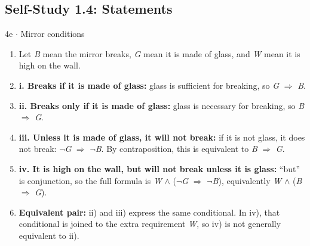 \documentclass[11pt]{article}
\begin{document}
\begin{keepsection}\subsection{Self-Study 1.4: Statements}

\begin{workedbox}{4e \ensuremath{\cdot} Mirror conditions}
\begin{enumerate}
\item Let \textit{B} mean the mirror breaks, \textit{G} mean it is made of glass, and \textit{W} mean it is high on the wall.
\item \textbf{i. Breaks if it is made of glass:} glass is sufficient for breaking, so \textit{G} \ensuremath{\Rightarrow} \textit{B}.
\item \textbf{ii. Breaks only if it is made of glass:} glass is necessary for breaking, so \textit{B} \ensuremath{\Rightarrow} \textit{G}.
\item \textbf{iii. Unless it is made of glass, it will not break:} if it is not glass, it does not break: \ensuremath{\neg}\textit{G} \ensuremath{\Rightarrow} \ensuremath{\neg}\textit{B}. By contraposition, this is equivalent to \textit{B} \ensuremath{\Rightarrow} \textit{G}.
\item \textbf{iv. It is high on the wall, but will not break unless it is glass:} “but” is conjunction, so the full formula is \textit{W} \ensuremath{\land} (\ensuremath{\neg}\textit{G} \ensuremath{\Rightarrow} \ensuremath{\neg}\textit{B}), equivalently \textit{W} \ensuremath{\land} (\textit{B} \ensuremath{\Rightarrow} \textit{G}).
\item \textbf{Equivalent pair:} ii) and iii) express the same conditional. In iv), that conditional is joined to the extra requirement \textit{W}, so iv) is not generally equivalent to ii).
\end{enumerate}
\end{workedbox}

\end{keepsection}
\end{document}
